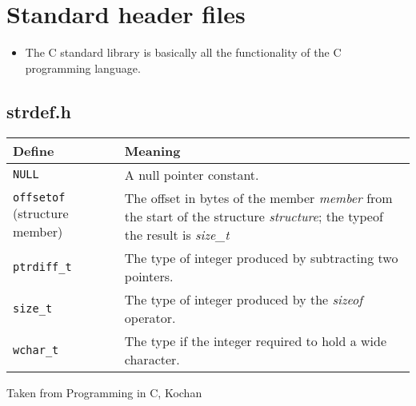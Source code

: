 \section{Standard header files}
\begin{itemize}
    \item The C standard library is basically all the functionality of the C programming language.
\end{itemize}

\subsection{strdef.h}
\begin{center}
    \begin{tabular}{ |p{6cm}|p{10cm}| }
        \hline
            Define & Meaning \\
        \hline
            \texttt{NULL}& A null pointer constant. \\ 
            \texttt{offsetof} (structure member) & The offset in bytes of the member \emph{member} from the start of the structure \emph{structure}; the typeof the result is \emph{size\_t} \\ 
            \texttt{ptrdiff_t} & The type of integer produced by subtracting two pointers. \\ 
            \texttt{size_t}& The type of integer produced by the \emph{sizeof} operator. \\ 
            \texttt{wchar_t}& The type if the integer required to hold a wide character. \\ 
        \hline
    \end{tabular}
    Taken from Programming in C, Kochan
\end{center}

